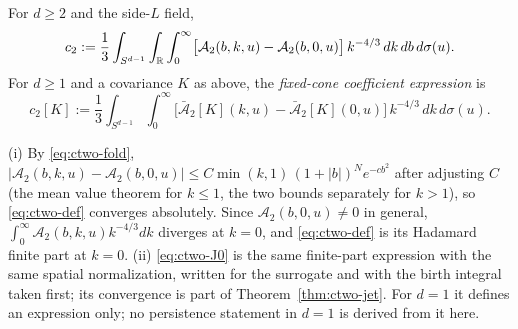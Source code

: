 \begin{definition}\label{def:ctwo-c2}
For $d\ge2$ and the side-$L$ field,
\begin{equation}\label{eq:ctwo-def}
c_2:=\frac13\int_{S^{d-1}}\int_\mathbb R\int_0^\infty\bigl[\mathcal A_2(b,k,u)-\mathcal A_2(b,0,u)\bigr]\,k^{-4/3}\,dk\,db\,d\sigma(u).
\end{equation}
For $d\ge1$ and a covariance $K$ as above, the \emph{fixed-cone coefficient expression} is
\begin{equation}\label{eq:ctwo-J0}
c_2[K]:=\frac13\int_{S^{d-1}}\int_0^\infty\bigl[\bar{\mathcal A}_2[K](k,u)-\bar{\mathcal A}_2[K](0,u)\bigr]\,k^{-4/3}\,dk\,d\sigma(u).
\end{equation}
\end{definition}

\begin{remark}\label{rem:ctwo-fp}
(i) By \eqref{eq:ctwo-fold}, $|\mathcal A_2(b,k,u)-\mathcal A_2(b,0,u)|\le C\min(k,1)\,(1+|b|)^Ne^{-cb^2}$ after adjusting $C$ (the mean value theorem for $k\le1$, the two bounds separately for $k>1$), so \eqref{eq:ctwo-def} converges absolutely. Since $\mathcal A_2(b,0,u)\ne0$ in general, $\int_0^\infty\mathcal A_2(b,k,u)k^{-4/3}dk$ diverges at $k=0$, and \eqref{eq:ctwo-def} is its Hadamard finite part at $k=0$. (ii) \eqref{eq:ctwo-J0} is the same finite-part expression with the same spatial normalization, written for the surrogate and with the birth integral taken first; its convergence is part of Theorem~\ref{thm:ctwo-jet}. For $d=1$ it defines an expression only; no persistence statement in $d=1$ is derived from it here.
\end{remark}

